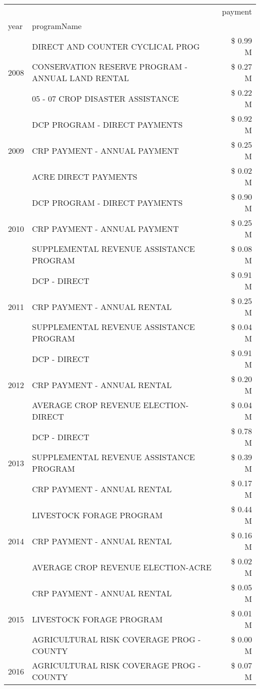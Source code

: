 \begin{tabular}{llr}
\toprule
 &  & payment \\
year & programName &  \\
\midrule
\multirow[t]{3}{*}{2008} & DIRECT AND COUNTER CYCLICAL PROG & \$ 0.99 M \\
 & CONSERVATION RESERVE PROGRAM - ANNUAL LAND RENTAL & \$ 0.27 M \\
 & 05 - 07 CROP DISASTER ASSISTANCE & \$ 0.22 M \\
\cline{1-3}
\multirow[t]{3}{*}{2009} & DCP PROGRAM - DIRECT PAYMENTS & \$ 0.92 M \\
 & CRP PAYMENT - ANNUAL PAYMENT & \$ 0.25 M \\
 & ACRE DIRECT PAYMENTS & \$ 0.02 M \\
\cline{1-3}
\multirow[t]{3}{*}{2010} & DCP PROGRAM - DIRECT PAYMENTS & \$ 0.90 M \\
 & CRP PAYMENT - ANNUAL PAYMENT & \$ 0.25 M \\
 & SUPPLEMENTAL REVENUE ASSISTANCE PROGRAM & \$ 0.08 M \\
\cline{1-3}
\multirow[t]{3}{*}{2011} & DCP - DIRECT & \$ 0.91 M \\
 & CRP PAYMENT - ANNUAL RENTAL & \$ 0.25 M \\
 & SUPPLEMENTAL REVENUE ASSISTANCE PROGRAM & \$ 0.04 M \\
\cline{1-3}
\multirow[t]{3}{*}{2012} & DCP - DIRECT & \$ 0.91 M \\
 & CRP PAYMENT - ANNUAL RENTAL & \$ 0.20 M \\
 & AVERAGE CROP REVENUE ELECTION-DIRECT & \$ 0.04 M \\
\cline{1-3}
\multirow[t]{3}{*}{2013} & DCP - DIRECT & \$ 0.78 M \\
 & SUPPLEMENTAL REVENUE ASSISTANCE PROGRAM & \$ 0.39 M \\
 & CRP PAYMENT - ANNUAL RENTAL & \$ 0.17 M \\
\cline{1-3}
\multirow[t]{3}{*}{2014} & LIVESTOCK FORAGE PROGRAM & \$ 0.44 M \\
 & CRP PAYMENT - ANNUAL RENTAL & \$ 0.16 M \\
 & AVERAGE CROP REVENUE ELECTION-ACRE & \$ 0.02 M \\
\cline{1-3}
\multirow[t]{3}{*}{2015} & CRP PAYMENT - ANNUAL RENTAL & \$ 0.05 M \\
 & LIVESTOCK FORAGE PROGRAM & \$ 0.01 M \\
 & AGRICULTURAL RISK COVERAGE PROG - COUNTY & \$ 0.00 M \\
\cline{1-3}
\multirow[t]{3}{*}{2016} & AGRICULTURAL RISK COVERAGE PROG - COUNTY & \$ 0.07 M \\

\end{tabular}
